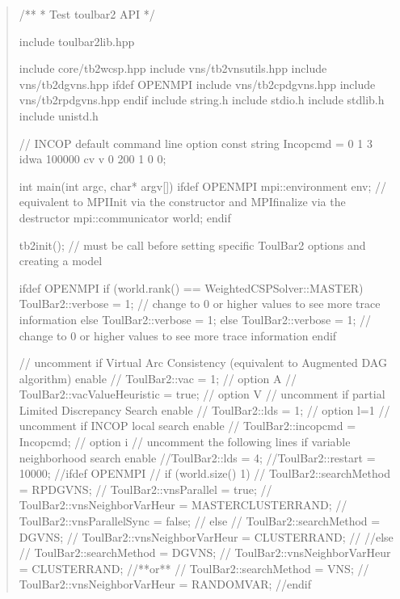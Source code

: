 \documentclass[letterpaper,10pt,openany,oneside,english]{sphinxmanual}
\begin{document}
\sphinxAtStartPar
{}
\begin{quote}

\sphinxAtStartPar
{}

\begin{sphinxVerbatim}[commandchars=\\\{\}]

/**
 * Test toulbar2 API
 */

\PYGZsh{}include \PYGZdq{}toulbar2lib.hpp\PYGZdq{}

\PYGZsh{}include \PYGZdq{}core/tb2wcsp.hpp\PYGZdq{}
\PYGZsh{}include \PYGZdq{}vns/tb2vnsutils.hpp\PYGZdq{}
\PYGZsh{}include \PYGZdq{}vns/tb2dgvns.hpp\PYGZdq{}
\PYGZsh{}ifdef OPENMPI
\PYGZsh{}include \PYGZdq{}vns/tb2cpdgvns.hpp\PYGZdq{}
\PYGZsh{}include \PYGZdq{}vns/tb2rpdgvns.hpp\PYGZdq{}
\PYGZsh{}endif
\PYGZsh{}include \PYGZlt{}string.h\PYGZgt{}
\PYGZsh{}include \PYGZlt{}stdio.h\PYGZgt{}
\PYGZsh{}include \PYGZlt{}stdlib.h\PYGZgt{}
\PYGZsh{}include \PYGZlt{}unistd.h\PYGZgt{}

// INCOP default command line option
const string Incop\PYGZus{}cmd = \PYGZdq{}0 1 3 idwa 100000 cv v 0 200 1 0 0\PYGZdq{};

int main(int argc, char* argv[])
\PYGZob{}
\PYGZsh{}ifdef OPENMPI
    mpi::environment env; // equivalent to MPI\PYGZus{}Init via the constructor and MPI\PYGZus{}finalize via the destructor
    mpi::communicator world;
\PYGZsh{}endif

    tb2init(); // must be call before setting specific ToulBar2 options and creating a model

\PYGZsh{}ifdef OPENMPI
    if (world.rank() == WeightedCSPSolver::MASTER)
        ToulBar2::verbose = \PYGZhy{}1; // change to 0 or higher values to see more trace information
    else
        ToulBar2::verbose = \PYGZhy{}1;
\PYGZsh{}else
    ToulBar2::verbose = \PYGZhy{}1; // change to 0 or higher values to see more trace information
\PYGZsh{}endif

    // uncomment if Virtual Arc Consistency (equivalent to Augmented DAG algorithm) enable
    //	ToulBar2::vac = 1; // option \PYGZhy{}A
    //	ToulBar2::vacValueHeuristic = true; // option \PYGZhy{}V
    // uncomment if partial Limited Discrepancy Search enable
    //	ToulBar2::lds = 1;  // option \PYGZhy{}l=1
    // uncomment if INCOP local search enable
    //	ToulBar2::incop\PYGZus{}cmd = Incop\PYGZus{}cmd; // option \PYGZhy{}i
    // uncomment the following lines if variable neighborhood search enable
    //ToulBar2::lds = 4;
    //ToulBar2::restart = 10000;
    //\PYGZsh{}ifdef OPENMPI
    //     if (world.size() \PYGZgt{} 1) \PYGZob{}
    //    	 ToulBar2::searchMethod = RPDGVNS;
    //    	 ToulBar2::vnsParallel = true;
    //    	 ToulBar2::vnsNeighborVarHeur = MASTERCLUSTERRAND;
    //    	 ToulBar2::vnsParallelSync = false;
    //     \PYGZcb{} else \PYGZob{}
    //    	 ToulBar2::searchMethod = DGVNS;
    //    	 ToulBar2::vnsNeighborVarHeur = CLUSTERRAND;
    //     \PYGZcb{}
    //\PYGZsh{}else
    //	ToulBar2::searchMethod = DGVNS;
    //	ToulBar2::vnsNeighborVarHeur = CLUSTERRAND;
    //**or**
    //  ToulBar2::searchMethod = VNS;
    //  ToulBar2::vnsNeighborVarHeur = RANDOMVAR;
    //\PYGZsh{}endif


\end{sphinxVerbatim}
\end{quote}
\end{document}
